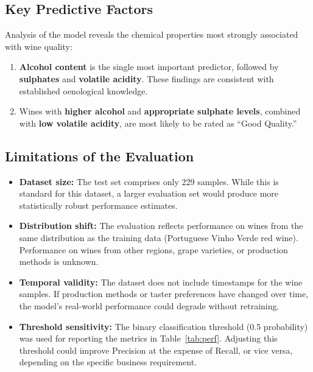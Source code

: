 \documentclass[11pt,a4paper]{article}
\begin{document}
\subsection{Key Predictive Factors}

Analysis of the model reveals the chemical properties most strongly associated with wine quality:

\begin{enumerate}[leftmargin=*]
    \item \textbf{Alcohol content} is the single most important predictor, followed by \textbf{sulphates} and \textbf{volatile acidity}. These findings are consistent with established oenological knowledge.
    \item Wines with \textbf{higher alcohol} and \textbf{appropriate sulphate levels}, combined with \textbf{low volatile acidity}, are most likely to be rated as ``Good Quality.''
\end{enumerate}

\subsection{Limitations of the Evaluation}

\begin{itemize}[leftmargin=*]
    \item \textbf{Dataset size:} The test set comprises only 229 samples. While this is standard for this dataset, a larger evaluation set would produce more statistically robust performance estimates.
    \item \textbf{Distribution shift:} The evaluation reflects performance on wines from the same distribution as the training data (Portuguese Vinho Verde red wine). Performance on wines from other regions, grape varieties, or production methods is unknown.
    \item \textbf{Temporal validity:} The dataset does not include timestamps for the wine samples. If production methods or taster preferences have changed over time, the model's real-world performance could degrade without retraining.
    \item \textbf{Threshold sensitivity:} The binary classification threshold (0.5 probability) was used for reporting the metrics in Table~\ref{tab:perf}. Adjusting this threshold could improve Precision at the expense of Recall, or vice versa, depending on the specific business requirement.
\end{itemize}

\end{document}
